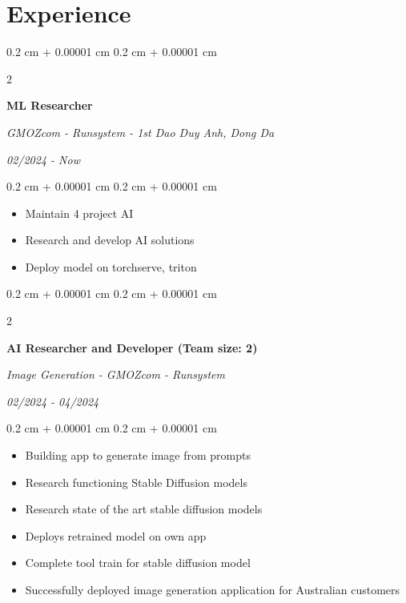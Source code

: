 \documentclass[10pt, letterpaper]{article}
\newenvironment{highlights}{
    \begin{itemize}[
        topsep=0.10 cm,
        parsep=0.10 cm,
        partopsep=0pt,
        itemsep=0pt,
        leftmargin=0.4 cm + 10pt
    ]
}{
    \end{itemize}
} %
\newenvironment{onecolentry}{
    \begin{adjustwidth}{
        0.2 cm + 0.00001 cm
    }{
        0.2 cm + 0.00001 cm
    }
}{
    \end{adjustwidth}
} %
\newenvironment{twocolentry}[2][]{
    \onecolentry
    \def\secondColumn{#2}
    \setcolumnwidth{\fill, 4.5 cm}
    \begin{paracol}{2}
}{
    \switchcolumn \raggedleft \secondColumn
    \end{paracol}
    \endonecolentry
} %
\begin{document}
    \section{Experience}

    \begin{twocolentry}{
        \textit{02/2024 - Now}
    }
        \textbf{ML Researcher}
        
        \textit{GMOZcom - Runsystem - 1st Dao Duy Anh, Dong Da}
    \end{twocolentry}

    \begin{onecolentry}
        \begin{highlights}
            \item Maintain 4 project AI
            \item Research and develop AI solutions
            \item Deploy model on torchserve, triton
        \end{highlights}
    \end{onecolentry}

    \vspace{0.2 cm}

    \begin{twocolentry}{
        \textit{02/2024 - 04/2024}
    }
        \textbf{AI Researcher and Developer (Team size: 2)}
        
        \textit{Image Generation - GMOZcom - Runsystem}
    \end{twocolentry}

    \begin{onecolentry}
        \begin{highlights}
            \item Building app to generate image from prompts
            \item Research functioning Stable Diffusion models
            \item Research state of the art stable diffusion models
            \item Deploys retrained model on own app
            \item Complete tool train for stable diffusion model
            \item Successfully deployed image generation application for Australian customers
        \end{highlights}
    \end{onecolentry}

    \vspace{0.2 cm}
\end{document}
